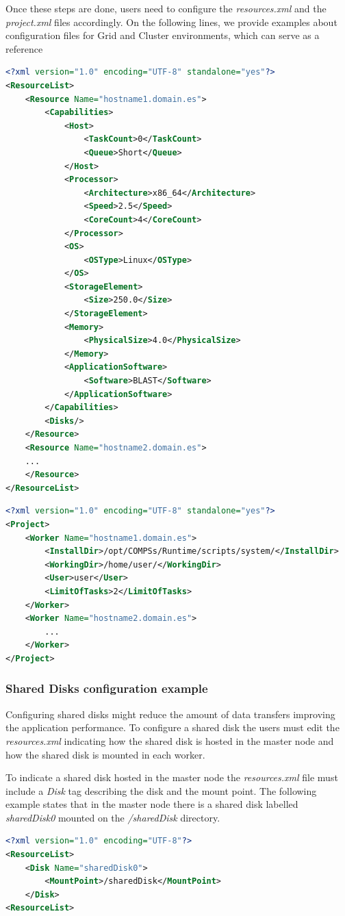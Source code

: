 Once these steps are done, users need to configure the \textit{resources.xml} and the \textit{project.xml} files accordingly.
On the following lines, we provide examples about configuration files for Grid and Cluster environments, 
which can serve as a reference

\begin{lstlisting}[language=xml]
<?xml version="1.0" encoding="UTF-8" standalone="yes"?>
<ResourceList>
    <Resource Name="hostname1.domain.es">
        <Capabilities>
            <Host>
                <TaskCount>0</TaskCount>
                <Queue>Short</Queue>
            </Host>
            <Processor>
                <Architecture>x86_64</Architecture>
                <Speed>2.5</Speed>
                <CoreCount>4</CoreCount>
            </Processor>
            <OS>
                <OSType>Linux</OSType>
            </OS>
            <StorageElement>
                <Size>250.0</Size>
            </StorageElement>
            <Memory>
                <PhysicalSize>4.0</PhysicalSize>
            </Memory>
            <ApplicationSoftware>
                <Software>BLAST</Software>
            </ApplicationSoftware>
        </Capabilities>
        <Disks/>
    </Resource>
    <Resource Name="hostname2.domain.es">
	...
    </Resource>
</ResourceList>
\end{lstlisting}

\begin{lstlisting}[language=xml]
<?xml version="1.0" encoding="UTF-8" standalone="yes"?>
<Project>
    <Worker Name="hostname1.domain.es">
        <InstallDir>/opt/COMPSs/Runtime/scripts/system/</InstallDir>
        <WorkingDir>/home/user/</WorkingDir>
        <User>user</User>
        <LimitOfTasks>2</LimitOfTasks>
    </Worker>
    <Worker Name="hostname2.domain.es">
        ...
    </Worker>
</Project>
\end{lstlisting}


\subsubsection{Shared Disks configuration example}
Configuring shared disks might reduce the amount of data transfers improving the application performance. To configure a 
shared disk the users must edit the \textit{resources.xml} indicating how the shared disk is hosted in the master node 
and how the shared disk is mounted in each worker. 

To indicate a shared disk hosted in the master node the \textit{resources.xml} file must include a \textit{Disk} tag describing
the disk and the mount point. The following example states that in the master node there is a shared disk labelled 
\textit{sharedDisk0} mounted on the \textit{/sharedDisk} directory.
\begin{lstlisting}[language=xml]
<?xml version="1.0" encoding="UTF-8"?>
<ResourceList>
    <Disk Name="sharedDisk0">
        <MountPoint>/sharedDisk</MountPoint>
    </Disk>
<ResourceList>
\end{lstlisting}

